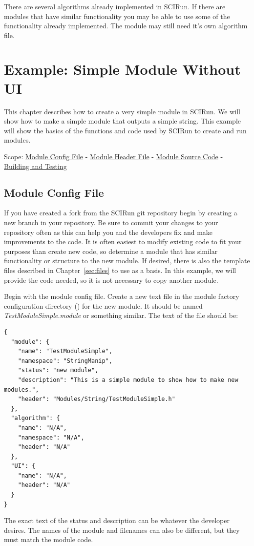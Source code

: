 \documentclass[fleqn,11pt,openany]{book}
\begin{document}
There are several algorithms already implemented in SCIRun.  
If there are modules that have similar functionality you may be able to use some of the functionality already implemented.  
The module may still need it's own algorithm file.  



\chapter{Example: Simple Module Without UI}
\label{sec:ex_simple}

\begin{introduction}
This chapter describes how to create a very simple module in SCIRun.  
We will show how to make a simple module that outputs a simple string.  
This example will show the basics of the functions and code used by SCIRun to create and run modules.

Scope: \hyperref[sec:examp_config]{Module Config File} - \hyperref[sec:examp_header]{Module Header File} - \hyperref[sec:examp_source]{Module Source Code} - \hyperref[sec:testing]{Building and Testing}
\end{introduction}

\section{Module Config File}
\label{sec:examp_config}

If you have created a fork from the SCIRun git repository begin by creating a new branch in your repository.  
Be sure to commit your changes to your repository often as this can help you and the developers fix and make improvements to the code.
It is often easiest to modify existing code to fit your purposes than create new code, so determine a module that has similar functionality or structure to the new module.  
If desired, there is also the template files described in Chapter~\ref{sec:files} to use as a basis.  
In this example, we will provide the code needed, so it is not necessary to copy another module.  

Begin with the module config file.  
Create a new text file in the module factory configuration directory (\emph{}) for the new module.  
It should be named \emph{TestModuleSimple.module} or something similar.  
The text of the file should be:
\begin{verbatim}
{
  "module": {
    "name": "TestModuleSimple",
    "namespace": "StringManip",
    "status": "new module",
    "description": "This is a simple module to show how to make new modules.",
    "header": "Modules/String/TestModuleSimple.h"
  },
  "algorithm": {
    "name": "N/A",
    "namespace": "N/A",
    "header": "N/A"
  },
  "UI": {
    "name": "N/A",
    "header": "N/A"
  }
}
\end{verbatim}
The exact text of the status and description can be whatever the developer desires. 
The names of the module and filenames can also be different, but they must match the module code.  
\end{document}
